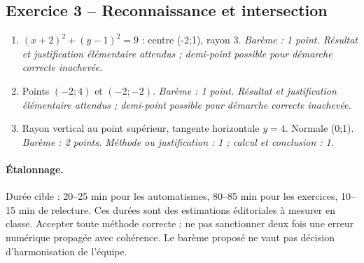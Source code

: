 \subsection*{Exercice 3 -- Reconnaissance et intersection}
\begin{enumerate}
\item $(x+2)^2+(y-1)^2=9$ : centre (-2;1), rayon 3. \textit{Barème : 1 point. Résultat et justification élémentaire attendus ; demi-point possible pour démarche correcte inachevée.}
\item Points $(-2;4)$ et $(-2;-2)$. \textit{Barème : 1 point. Résultat et justification élémentaire attendus ; demi-point possible pour démarche correcte inachevée.}
\item Rayon vertical au point supérieur, tangente horizontale $y=4$. Normale (0;1). \textit{Barème : 2 points. Méthode ou justification : 1 ; calcul et conclusion : 1.}
\end{enumerate}
\paragraph{Étalonnage.} Durée cible : 20–25 min pour les automatismes, 80–85 min pour les exercices, 10–15 min de relecture. Ces durées sont des estimations éditoriales à mesurer en classe. Accepter toute méthode correcte ; ne pas sanctionner deux fois une erreur numérique propagée avec cohérence. Le barème proposé ne vaut pas décision d’harmonisation de l’équipe.
